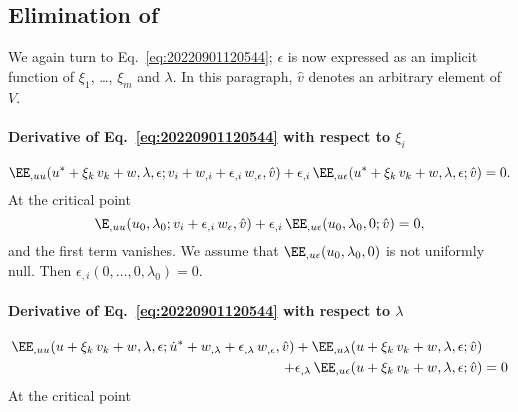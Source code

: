 \subsection{Elimination of}
\label{sec:20221102134138}

We again turn to Eq.~\eqref{eq:20220901120544}; \(\epsilon\) is now expressed as an implicit function of \(\xi_1\), \dots,
\(\xi_m\) and \(\lambda\). In this paragraph, $\hat{v}$ denotes an arbitrary element of $V$.

\paragraph{Derivative of Eq.~\eqref{eq:20220901120544} with respect to \(\xi_i\)}
\begin{equation}
  \label{eq:20221102205016}
  \EE_{,uu}(u^\ast + \xi_k \, v_k + w, \lambda, \epsilon; v_i + w_{,i} + \epsilon_{,i} \, w_{,\epsilon}, \hat{v}) + \epsilon_{,i} \, \EE_{,u\epsilon}(u^\ast + \xi_k \, v_k + w, \lambda, \epsilon; \hat{v}) = 0.
\end{equation}
At the critical point
\begin{equation}
  \E_{,uu}(u_0, \lambda_0; v_i + \epsilon_{,i} \, w_\epsilon, \hat{v}) + \epsilon_{,i} \, \EE_{,u\epsilon}(u_0, \lambda_0, 0; \hat{v}) = 0,
\end{equation}
and the first term vanishes. We assume that \(\EE_{,u\epsilon}(u_0, \lambda_0, 0)\) is not uniformly null. Then
\(\epsilon_{,i}(0, \ldots, 0, \lambda_0) = 0\).

\paragraph{Derivative of Eq.~\eqref{eq:20220901120544} with respect to \(\lambda\)}
\begin{equation}
  \label{eq:20221103054732}
  \begin{aligned}[b]
    \EE_{,uu}(u + \xi_k \, v_k + w, \lambda, \epsilon; \dot{u}^\ast + w_{,\lambda} + \epsilon_{,\lambda} \, w_{,\epsilon}, \hat{v})
    + \EE_{,u\lambda}(u + \xi_k \, v_k + w, \lambda, \epsilon; \hat{v})&\\
    + \epsilon_{,\lambda} \, \EE_{,u\epsilon}(u + \xi_k \, v_k + w, \lambda, \epsilon; \hat{v}) &= 0
  \end{aligned}
\end{equation}
At the critical point

